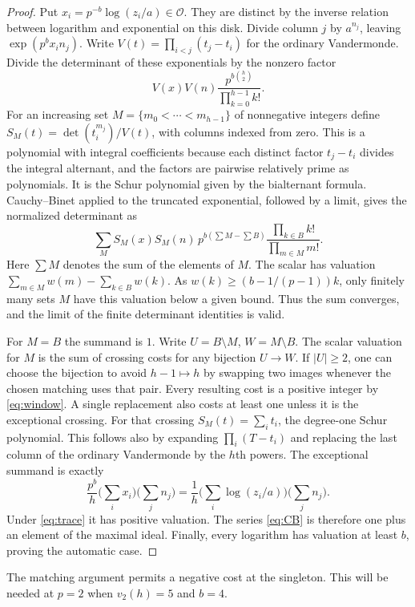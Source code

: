 \documentclass[11pt]{article}
\newcommand{\OO}{\mathcal O}
\begin{document}
\begin{proof}
Put $x_i=p^{-b}\log(z_i/a)\in\OO$. They are distinct by the inverse relation between logarithm and exponential on this disk. Divide column $j$ by $a^{n_j}$, leaving $\exp(p^b x_i n_j)$. Write $V(t)=\prod_{i<j}(t_j-t_i)$ for the ordinary Vandermonde. Divide the determinant of these exponentials by the nonzero factor
\[
 V(x)V(n)\frac{p^{b\binom h2}}{\prod_{k=0}^{h-1}k!}.
\]
For an increasing set $M=\{m_0<\cdots<m_{h-1}\}$ of nonnegative integers define
$S_M(t)=\det(t_i^{m_j})/V(t)$, with columns indexed from zero. This is a polynomial with integral coefficients because each distinct factor $t_j-t_i$ divides the integral alternant, and the factors are pairwise relatively prime as polynomials. It is the Schur polynomial given by the bialternant formula. Cauchy--Binet applied to the truncated exponential, followed by a limit, gives the normalized determinant as
\begin{equation}\label{eq:CB}
 \sum_M S_M(x)S_M(n)\,p^{b(\sum M-\sum B)}
           \frac{\prod_{k\in B} k!}{\prod_{m\in M}m!}.
\end{equation}
Here $\sum M$ denotes the sum of the elements of $M$. The scalar has valuation
$\sum_{m\in M}w(m)-\sum_{k\in B}w(k)$. As $w(k)\ge (b-1/(p-1))k$, only finitely many sets $M$ have this valuation below a given bound. Thus the sum converges, and the limit of the finite determinant identities is valid.

For $M=B$ the summand is $1$. Write $U=B\setminus M$, $W=M\setminus B$. The scalar valuation for $M$ is the sum of crossing costs for any bijection $U\to W$. If $|U|\ge2$, one can choose the bijection to avoid $h-1\mapsto h$ by swapping two images whenever the chosen matching uses that pair. Every resulting cost is a positive integer by \eqref{eq:window}. A single replacement also costs at least one unless it is the exceptional crossing. For that crossing $S_M(t)=\sum_i t_i$, the degree-one Schur polynomial. This follows also by expanding $\prod_i(T-t_i)$ and replacing the last column of the ordinary Vandermonde by the $h$th powers. The exceptional summand is exactly
\[
 \frac{p^b}{h}\Big(\sum_i x_i\Big)\Big(\sum_j n_j\Big)
 =\frac{1}{h}\Big(\sum_i\log(z_i/a)\Big)\Big(\sum_j n_j\Big).
\]
Under \eqref{eq:trace} it has positive valuation. The series \eqref{eq:CB} is therefore one plus an element of the maximal ideal. Finally, every logarithm has valuation at least $b$, proving the automatic case.
\end{proof}
The matching argument permits a negative cost at the singleton. This will be needed at $p=2$ when $v_2(h)=5$ and $b=4$.
\end{document}
